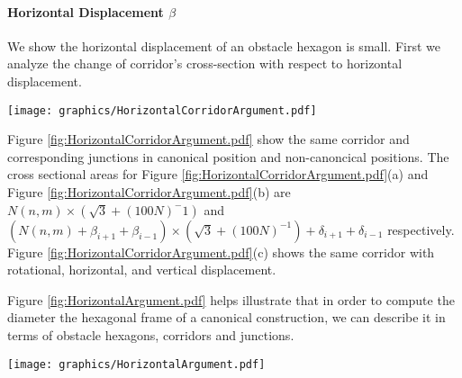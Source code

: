 \paragraph{Horizontal Displacement $\beta$}

We show the horizontal displacement of an obstacle hexagon is small.
First we analyze the change of corridor's cross-section with respect to horizontal displacement.

\begin{minipage}{\linewidth}
\begin{center}
\texttt{[image: graphics/HorizontalCorridorArgument.pdf]}
\label{fig:HorizontalCorridorArgument.pdf}
\end{center}
\end{minipage}

Figure \ref{fig:HorizontalCorridorArgument.pdf} show the same corridor and corresponding junctions in canonical position and non-canoncical positions.  
The cross sectional areas for Figure \ref{fig:HorizontalCorridorArgument.pdf}(a) and Figure \ref{fig:HorizontalCorridorArgument.pdf}(b) are $N(n,m) \times (\sqrt{3} + (100N)^-1)$ and $(N(n,m) + \beta_{i+1} + \beta_{i-1}) \times (\sqrt{3} + (100N)^{-1}) + \delta_{i+1} + \delta_{i-1}$ respectively.  
Figure \ref{fig:HorizontalCorridorArgument.pdf}(c) shows the same corridor with rotational, horizontal, and vertical displacement.

Figure \ref{fig:HorizontalArgument.pdf} helps illustrate that in order to compute the diameter the hexagonal frame of a canonical construction, we can describe it in terms of obstacle hexagons, corridors and junctions.

\begin{minipage}{\linewidth}
\begin{center}
\texttt{[image: graphics/HorizontalArgument.pdf]}
\label{fig:HorizontalArgument.pdf}
\end{center}
\end{minipage}

